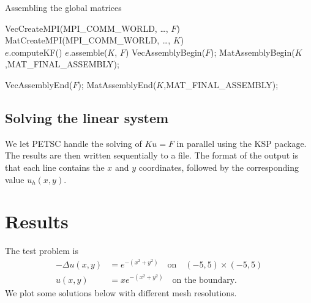 \documentclass[12pt]{extreport}
\begin{document}
\begin{algorithm}
  \caption{Assembling the global matrices}
  \begin{algorithmic}
    \State VecCreateMPI(MPI\_COMM\_WORLD, \ldots, $F$)
    \State MatCreateMPI(MPI\_COMM\_WORLD, \ldots, $K$) \\
    \State $e$.computeKF()
    \State $e$.assemble($K$, $F$)
    \EndFor
    \State VecAssemblyBegin($F$);
    \State MatAssemblyBegin($K$,MAT\_FINAL\_ASSEMBLY);

    \State VecAssemblyEnd($F$);
    \State MatAssemblyEnd($K$,MAT\_FINAL\_ASSEMBLY);
  \end{algorithmic}
\end{algorithm}

\subsection*{Solving the linear system}
We let PETSC handle the solving of $Ku = F$ in parallel using the KSP package. The results are then written sequentially to a file. The format of the output is that each line contains the $x$ and $y$ coordinates, followed by the corresponding value $u_h(x,y)$.

\section*{Results}
The test problem is
\begin{align}
  -\Delta u(x,y) &= e^{-(x^2 + y^2)} \quad \text{on} \quad (-5,5) \times (-5,5) \\
  u(x,y) &= xe^{-(x^2+y^2)} \quad \text{on the boundary}.
\end{align}
We plot some solutions below with different mesh resolutions.
\end{document}
